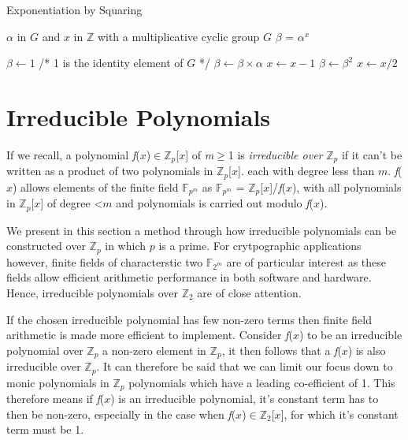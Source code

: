\documentclass[iwp,first]{luthesis}
\begin{document}
\begin{algorithm}
\caption{Exponentiation by Squaring}
\begin{algorithmic} 
\REQUIRE $\alpha$ in $G$ and $x$ in $\mathbb{Z}$ with a multiplicative cyclic group $G$
\ENSURE $\beta$ = $\alpha^x$
\begin{enumerate}
\STATE $\beta \leftarrow 1$ /* 1 is the identity element of $G$ */
\STATE $\beta \leftarrow \beta \times \alpha$
\STATE $x \leftarrow x - 1$
\ENDIF
\STATE $\beta \leftarrow \beta^2$
\STATE $x \leftarrow x/2$
\ENDWHILE
\end{enumerate}
\end{algorithmic}
\end{algorithm}

\section{Irreducible Polynomials}

If we recall,  a polynomial \textit{f}($x$)$\in\mathbb{Z}_p$[$x$] of \textit{m}$\geq$1 is \textit{irreducible over} $\mathbb{Z}_p$ if it can't be written as a product of two polynomials in $\mathbb{Z}_p$[$x$]. each with degree less than $m$. \textit{f}($x$) allows elements of the finite field $\mathbb{F}_{p^m}$ as $\mathbb{F}_{p^m}$ = $\mathbb{Z}_p$[$x$]/\textit{f}($x$), with all polynomials in $\mathbb{Z}_p$[$x$] of degree \textless $m$ and polynomials is carried out modulo \textit{f}($x$).

We present in this section a method through how irreducible polynomials can be constructed over $\mathbb{Z}_p$ in which $p$ is a prime. For crytpographic applications however, finite fields of characterstic two $\mathbb{F}_{2^m}$ are of particular interest as these fields allow efficient arithmetic performance in both software and hardware. Hence, irreducible polynomials over $\mathbb{Z}_2$ are of close attention.

If the chosen irreducible polynomial has few non-zero terms then finite field arithmetic is made more efficient to implement. Consider \textit{f}($x$) to be an irreducible polynomial over $\mathbb{Z}_p$ a non-zero element in $\mathbb{Z}_p$, it then follows that a \textit{f}($x$) is also irreducible over $\mathbb{Z}_p$. It can therefore be said that we can limit our focus down to monic polynomials in $\mathbb{Z}_p$ polynomials which have a leading co-efficient of 1. This therefore means if \textit{f}($x$) is an irreducible polynomial, it's constant term has to then be non-zero, especially in the case when \textit{f}($x$)$\in\mathbb{Z}_2$[$x$], for which it's constant term must be 1. 
\end{document}

